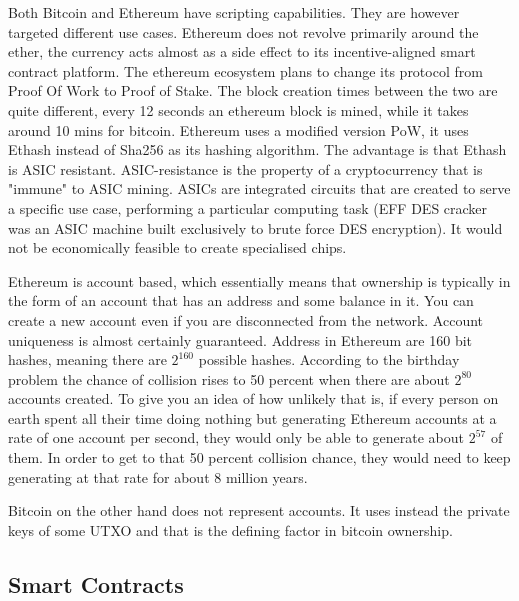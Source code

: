 \documentclass{article}
\begin{document}
Both Bitcoin and Ethereum have scripting capabilities. They are however targeted different use cases. Ethereum does not revolve primarily around the ether, the currency acts almost as a side effect to its incentive-aligned smart contract platform. The ethereum ecosystem plans to change its protocol from Proof Of Work to Proof of Stake. \newline
The block creation times between the two are quite different, every 12 seconds an ethereum block is mined, while it takes around 10 mins for bitcoin. \newline
Ethereum uses a modified version PoW, it uses Ethash instead of Sha256 as its hashing algorithm. The advantage is that Ethash is ASIC resistant. ASIC-resistance is the property of a cryptocurrency that is "immune" to ASIC mining. ASICs are integrated circuits that are created to serve a specific use case, performing a particular computing task (EFF DES cracker was an ASIC machine built exclusively to brute force DES encryption). It would not be economically feasible to create specialised chips. \newline

Ethereum is account based, which essentially means that ownership is typically in the form of an account that has an address and some balance in it. You can create a new account even if you are disconnected from the network. Account uniqueness is almost certainly guaranteed. Address in Ethereum are 160 bit hashes, meaning there are $2^160$ possible hashes. According to the birthday problem the chance of collision rises to 50 percent when there are about $2^80$ accounts created. To give you an idea of how unlikely that is, if every person on earth spent all their time doing nothing but generating Ethereum accounts at a rate of one account per second, they would only be able to generate about $2^57$ of them. In order to get to that 50 percent collision chance, they would need to keep generating at that rate for about 8 million years. \newline

Bitcoin on the other hand does not represent accounts. It uses instead the private keys of some UTXO and that is the defining factor in bitcoin ownership.



\subsection{Smart Contracts}
\end{document}
